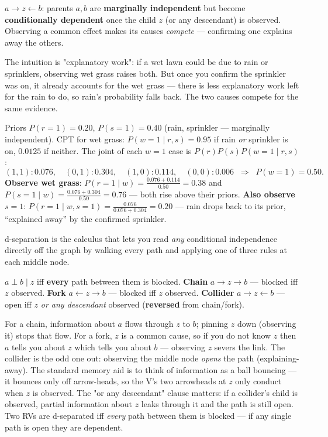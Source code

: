 \documentclass[11pt, a4paper]{article}
\newcommand{\kw}[1]{\textbf{#1}}
\begin{document}
\begin{defbox}
$a\to z\leftarrow b$: parents $a,b$ are \kw{marginally independent} but become \kw{conditionally
dependent} once the child $z$ (or any descendant) is observed. Observing a common effect makes its
causes \emph{compete} — confirming one explains away the others.
\end{defbox}

The intuition is "explanatory work": if a wet lawn could be due to rain or sprinklers, observing wet
grass raises both. But once you confirm the sprinkler was on, it already accounts for the wet grass
— there is less explanatory work left for the rain to do, so rain's probability falls back. The two
causes compete for the same evidence.

\begin{exbox}
Priors $P(r{=}1)=0.20$, $P(s{=}1)=0.40$ (rain, sprinkler — marginally independent). CPT for wet
grass: $P(w{=}1\mid r,s)=0.95$ if rain \emph{or} sprinkler is on, $0.0125$ if neither. The joint of
each $w{=}1$ case is $P(r)P(s)P(w{=}1\mid r,s)$:
\[
(1,1)\!:0.076,\quad(0,1)\!:0.304,\quad(1,0)\!:0.114,\quad(0,0)\!:0.006
\;\;\Rightarrow\;\; P(w{=}1)=0.50.
\]
\kw{Observe wet grass}: $P(r{=}1\mid w)=\tfrac{0.076+0.114}{0.50}=0.38$ and
$P(s{=}1\mid w)=\tfrac{0.076+0.304}{0.50}=0.76$ — both rise above their priors.
\kw{Also observe $s{=}1$}: $P(r{=}1\mid w,s{=}1)=\tfrac{0.076}{0.076+0.304}=0.20$ — rain drops back
to its prior, ``explained away'' by the confirmed sprinkler.
\end{exbox}

d-separation is the calculus that lets you read \emph{any} conditional independence directly off the
graph by walking every path and applying one of three rules at each middle node.

\begin{defbox}[d-separation]
$a\perp b\mid z$ iff \kw{every} path between them is blocked.
\kw{Chain} $a\to z\to b$ — blocked iff $z$ observed.
\kw{Fork} $a\leftarrow z\to b$ — blocked iff $z$ observed.
\kw{Collider} $a\to z\leftarrow b$ — open iff $z$ \emph{or any descendant} observed
(\kw{reversed} from chain/fork).
\end{defbox}

For a chain, information about $a$ flows through $z$ to $b$; pinning $z$ down (observing it) stops
that flow. For a fork, $z$ is a common cause, so if you do not know $z$ then $a$ tells you about $z$
which tells you about $b$ — observing $z$ severs the link. The collider is the odd one out:
observing the middle node \emph{opens} the path (explaining-away). The standard memory aid is to
think of information as a ball bouncing — it bounces only off arrow-heads, so the V's two arrowheads
at $z$ only conduct when $z$ is observed. The "or any descendant" clause matters: if a collider's
child is observed, partial information about $z$ leaks through it and the path is still open. Two
RVs are d-separated iff \emph{every} path between them is blocked — if any single path is open they
are dependent.
\end{document}
